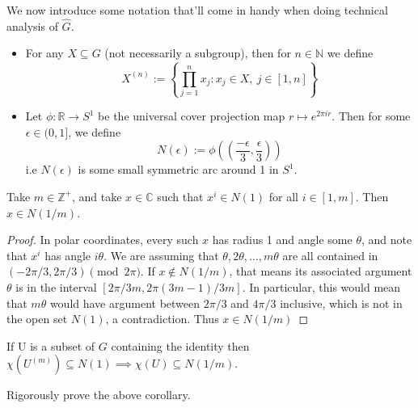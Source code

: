 \documentclass[11pt, x11names]{book}
\newcommand{\nn}{\mathbb{N}}
\newcommand{\zz}{\mathbb{Z}}
\newcommand{\rr}{\mathbb{R}}
\newcommand{\cc}{\mathbb{C}}
\newcommand{\set}[1]{\left\{ #1 \right\}}
\renewcommand{\brack}[1]{\left(   #1 \right)}
\renewcommand{\hat}{\widehat}
\begin{document}
We now introduce some notation that'll come in handy when doing technical analysis of $\hat{G}$.
\begin{itemize}
    \item For any $X \subseteq G$ (not necessarily a subgroup), then for $n \in \nn$ we define
    \begin{equation*}
        X^{(n)} := \set{\prod^n_{j=1} x_j: x_j \in X, \ j \in [1, n]}
    \end{equation*}
    \item Let $\phi: \rr \to S^1$ be the universal cover projection map $r \mapsto e^{2 \pi i r}$.
    Then for some $\epsilon \in (0, 1]$, we define
    \begin{equation*}
        N(\epsilon) := \phi\brack{\brack{\frac{-\epsilon}{3}, \frac{\epsilon}{3}}}
    \end{equation*}
    i.e $N(\epsilon)$ is some small symmetric arc around 1 in $S^1$.
\end{itemize}

\begin{lemma}
\label{compact-open key lemma}
Take $m \in \zz^+$, and take $x \in \cc$ such that $x^i \in N(1)$ for all $i \in [1, m]$.
Then $x \in N(1/m)$.
\end{lemma}
\begin{proof}
In polar coordinates, every such $x$ has radius 1 and angle some $\theta$, and note that $x^i$
has angle $i \theta$. We are assuming that $\theta, 2 \theta, \ldots, m\theta$ are all 
contained in $(-2\pi/3, 2\pi/3) \pmod{2\pi}$. If $x \notin N(1/m)$, that means its associated
argument $\theta$ is in the interval $[2\pi/3m, 2\pi (3m - 1)/3m]$. In particular, this would mean that $m \theta$ would have argument between $2 \pi / 3$ and $4\pi/3$ inclusive, which is not in the open set $N(1)$, a contradiction. Thus $x \in N(1/m)$
\end{proof}
\begin{corollary}
\label{compact-open key corollary}
    If U is a subset of $G$ containing the identity then $\chi(U^{(m)}) \subseteq N(1) \implies \chi(U) \subseteq N(1/m)$. 
\end{corollary}

\begin{exercise}
Rigorously prove the above corollary.
\end{exercise}
\end{document}
